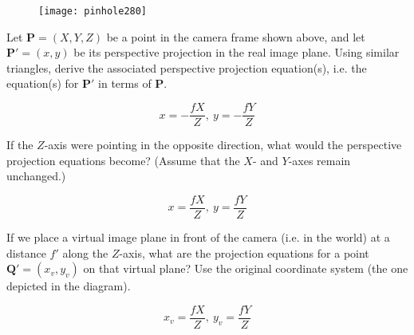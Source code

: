\begin{blocksection}
\question
\begin{figure}[H]
\centering
\texttt{[image: pinhole280]}
\end{figure}
Let $\mathbf{P} = (X, Y, Z)$ be a point in the camera frame shown above, and let $\mathbf{P'} = (x, y)$ be its perspective projection in the real image plane. Using similar triangles, derive the associated perspective projection equation(s), i.e. the equation(s) for $\mathbf{P'}$ in terms of $\mathbf{P}$.

\begin{solution}[0.75in]
$$x = -\frac{fX}{Z},~y = -\frac{fY}{Z}$$
\end{solution}
\end{blocksection}


\begin{blocksection}
\question If the $Z$-axis were pointing in the opposite direction, what would the perspective projection equations become? (Assume that the $X$- and $Y$-axes remain unchanged.)

\begin{solution}[0.75in]
$$x = \frac{fX}{Z},~y = \frac{fY}{Z}$$
\end{solution}
\end{blocksection}


\begin{blocksection}
\question If we place a virtual image plane in front of the camera (i.e. in the world) at a distance $f'$ along the $Z$-axis, what are the projection equations for a point $\mathbf{Q'} = (x_v, y_v)$ on that virtual plane? Use the original coordinate system (the one depicted in the diagram).

\begin{solution}[0.75in]
$$x_v = \frac{fX}{Z},~y_v = \frac{fY}{Z}$$
\end{solution}
\end{blocksection}
